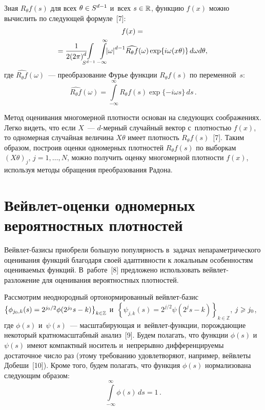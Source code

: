 \begin{multicols}{2}
Зная $R_\theta f(s)$ для всех $\theta\hm\in S^{d-1}$ и~всех $s\hm\in\mathbb{R}$,
функцию $f(x)$ можно вычислить по следующей формуле~[7]:
\begin{multline}
f(x)={}\\
\hspace*{-4mm}{}=\fr{1}{2(2\pi)^{d}}\!\!\!\!\int\limits_{S^{d-1}}
\int\limits_{-\infty}^{\infty}\!\!\!
\abs{\omega}^{d-1}\!\widehat{R_\theta f}(\omega)\exp
\{ i\omega(x \theta)\}\,d\omega d\theta,\!\!\!\!
\label{Inverse_Radon_transform}
\end{multline}
где $\widehat{R_\theta f}(\omega)$~---
преобразование Фурье функции $R_\theta f(s)$ по переменной~$s$:
\begin{equation*}
\widehat{R_\theta f}(\omega)=
\int\limits_{-\infty}^{\infty}R_\theta f(s)\exp\{-i\omega s\}\,ds\,.
\end{equation*}

Метод оценивания многомерной плотности основан на следующих соображениях.
Легко видеть, что если $X$~--- $d$-мер\-ный случайный вектор с~плотностью $f(x)$,
то одномерная случайная величина $X\theta$ имеет плот\-ность
$R_\theta f(s)$~[7]. Таким образом, построив оценки одномерных плотностей
$R_\theta f(s)$ по выборкам $(X\theta)_j$, $j=1,\ldots,N$, можно получить
оценку многомерной плотности $f(x)$, используя методы обращения преобразования
Ра\-дона.

\section{Вейвлет-оценки одномерных вероятностных плотностей}

Вейвлет-базисы приобрели большую популярность в~задачах непараметрического
оценивания функций благодаря своей адаптивности к локальным особенностям
оцениваемых функций. В~работе~[8] предложено использовать вейв\-лет-раз\-ло\-же\-ние
для оценивания вероятностных плотностей.

Рассмотрим неоднородный ортонормированный вейв\-лет-ба\-зис
$\left\{\phi_{j_0,k}(s)\hm=2^{j_0/2}\phi(2^{j_0}s-k)\right\}_{k\in\mathbb{Z}}$
и~$\left\{\psi_{j,k}(s)=2^{j/2}\psi(2^{j}s-k)\right\}_{k\in\mathbb{Z}}$,
$j\hm\geqslant j_0$, где $\phi(s)$ и~$\psi(s)$~--- масштабирующая
и~вейв\-лет-функ\-ции, порождающие некоторый кратномасштабный анализ~[9].
Будем полагать, что функции $\phi(s)$ и~$\psi(s)$ имеют компактный носитель
и~непрерывно дифференцируемы достаточное число раз (этому требованию удовлетворяют,
например, вейвлеты Добеши~[10]). Кроме того, будем полагать, что функция
$\phi(s)$ нормализована следующим образом:
$$
\int\limits_{-\infty}^{\infty}\phi(s)\,ds=1\,.
$$


\end{multicols}
